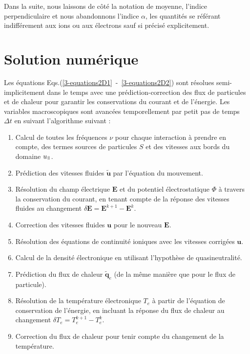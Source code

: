 \begin{refsection}
Dans la suite, nous laissons de côté la notation de moyenne, l'indice
perpendiculaire et nous abandonnons l'indice $\alpha$, les quantités se référant
indifférement aux ions ou aux électrons sauf si précisé explicitement.

\section{Solution numérique}

Les équations Eqs.(\ref{3-equations2D1}~-~\ref{3-equations2D2}) sont résolues
semi-implicitement dans le temps avec une prédiction-correction des flux de
particules et de chaleur pour garantir les conservations du courant et de
l'énergie. Les variables macroscopiques sont avancées temporellement par
petit pas de temps $\Delta t$ en suivant l'algorithme suivant :

\begin{enumerate}
  \item Calcul de toutes les fréquences $\nu$ pour
  chaque interaction à prendre en compte, des termes sources de particules
  $S$ et des vitesses aux bords du domaine $u_{\para}$.
  \item Prédiction des vitesses fluides $\tilde{\mathbf u}$ par
  l'équation du mouvement.
  \item Résolution du champ électrique $\mathbf E$ et du potentiel
  électrostatique $\Phi$ à travers la conservation du courant, en tenant compte de la
  réponse des vitesses fluides au changement $\delta \mathbf
  E=\mathbf E^{k+1}-\mathbf E^{k}$.
  \item Correction des vitesses fluides $\mathbf u$ pour le nouveau
  $\mathbf E$.
  \item Résolution des équations de continuité ioniques avec les vitesses
  corrigées $\mathbf u$.
  \item Calcul de la densité électronique en utilisant l'hypothèse de
  quasineutralité.
  \item Prédiction du flux de chaleur $\tilde{\mathbf q}_e$ (de la même manière
  que pour le flux de particule).
  \item Résolution de la température électronique $T_e$ à partir de l'équation
  de conservation de l'énergie, en incluant la réponse du flux de chaleur au
  changement $\delta T_e=T_e^{k+1}-T_e^{k}$.
  \item Correction du flux de chaleur pour tenir compte du changement de la
  température.
\end{enumerate}


\end{refsection}
